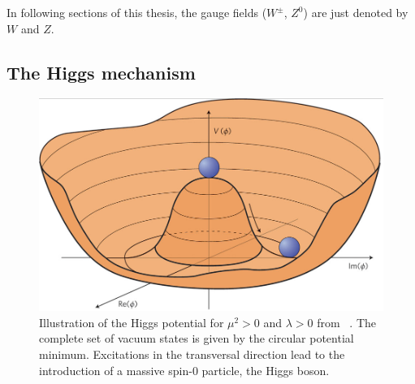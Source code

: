  In following sections of this thesis, the gauge fields ($W^\pm$, $Z^0$) are just denoted by $W$ and $Z$.



 
\subsection{The Higgs mechanism}\label{Higgsm}
\begin{figure}[h]
	\centering
	\includegraphics[width=0.4\linewidth]{Pics/cp1/Higgs}
	\caption{Illustration of the Higgs potential for $\mu^2>0 $ and $\lambda>0$ from ~\cite{Ellis:2013jnq}. The complete set of vacuum states is given by the circular potential minimum. Excitations in the transversal direction lead to the introduction of a massive spin-0 particle, the Higgs boson.}
	
	\label{fig:Higgs}
\end{figure}

